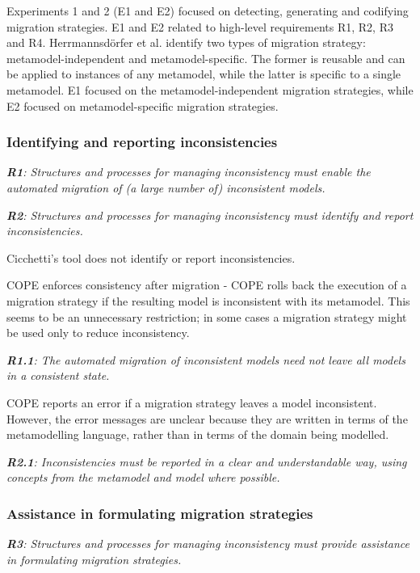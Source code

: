 \documentclass[a4paper]{article}
\begin{document}
Experiments 1 and 2 (E1 and E2) focused on detecting, generating and codifying migration strategies. E1 and E2 related to high-level requirements R1, R2, R3 and R4. Herrmannsd\"{o}rfer et al. identify two types of migration strategy: metamodel-independent and metamodel-specific. The former is reusable and can be applied to instances of any metamodel, while the latter is specific to a single metamodel. E1 focused on the metamodel-independent migration strategies, while E2 focused on metamodel-specific migration strategies.

\subsubsection{Identifying and reporting inconsistencies}

\emph{\textbf{R1}: Structures and processes for managing inconsistency must enable the automated migration of (a large number of) inconsistent models.}

\emph{\textbf{R2}: Structures and processes for managing inconsistency must identify and report inconsistencies.}

Cicchetti's tool does not identify or report inconsistencies.

COPE enforces consistency after migration - COPE rolls back the execution of a migration strategy if the resulting model is inconsistent with its metamodel. This seems to be an unnecessary restriction; in some cases a migration strategy might be used only to reduce inconsistency.

\emph{\textbf{R1.1}: The automated migration of inconsistent models need not leave all models in a consistent state.}

COPE reports an error if a migration strategy leaves a model inconsistent. However, the error messages are unclear because they are written in terms of the metamodelling language, rather than in terms of the domain being modelled.

\emph{\textbf{R2.1}: Inconsistencies must be reported in a clear and understandable way, using concepts from the metamodel and model where possible.}


\subsubsection{Assistance in formulating migration strategies}

\emph{\textbf{R3}: Structures and processes for managing inconsistency must provide assistance in formulating migration strategies.}
\end{document}
